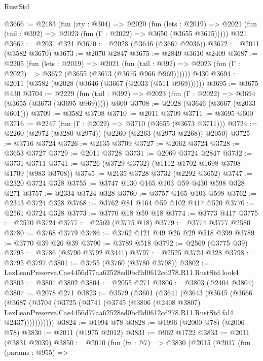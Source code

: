 \begin{lexlean}{RustStd}
\begin{coremodule}
@3666 := @2183
    (fun (rty : @304) =>
    @2020
      (fun (lets : @2019) =>
      @2021 (fun (tail : @392) => @2023 (fun (Γ : @2022) => @3650 (@3655 @3615)))))
    @321
@3667 := @2031 @321
@3670 := @2028 (@3646 (@3667 @2036))
@3672 := @2011 (@3582 @3670)
@3673 := @2070 @2847
@3675 := @2849 @3610 @2409
@3687 := @2205
    (fun (lets : @2019) =>
    @2021 (fun (tail : @392) => @2023 (fun (Γ : @2022) => @3672 (@3655 (@3673 (@3675 @966 @969))))))
    @430
@3694 := @2011 (@3582 (@2028 (@3646 (@3667 (@2033 (@511 @969))))))
@3695 := @3675 @430
@3704 := @2229
    (fun (tail : @392) => @2023 (fun (Γ : @2022) => @3694 (@3655 (@3673 (@3695 @969)))))
    @600
@3708 := @2028 (@3646 (@3667 (@2033 @601)))
@3709 := @3582 @3708
@3710 := @2011 @3709
@3711 := @3695 @600
@3716 := @2247 (fun (Γ : @2022) => @3710 (@3655 (@3673 @3711)))
@3724 := @2260 (@2972 (@3280 @2974)) (@2260 (@2263 (@2973 @2268)) @2050)
@3725 := @3716 @3724
@3726 := @2135 @3709
@3727 := @2062 @3724
@3728 := @3653 @3727
@3729 := @2011 @3728
@3731 := @2069 @3724 @2847
@3732 := @3731 @3711
@3741 := @3726 (@3729 @3732) (@1112 @1702 @1698 @3708 @1709 (@983 @3708))
@3745 := @2135 @3728 @3732 (@2292 @3652)
@3747 := @2320 @3724 @328
@3755 := @3747 @130 @165 @103 @59 @430 @598 @328 @271
@3757 := @2334 @3724 @328
@3760 := @3757 @165 @103 @598
@3762 := @2343 @3724 @328
@3768 := @3762 @81 @164 @59 @102 @417 @520
@3770 := @2561 @3724 @328
@3773 := @3770 @18 @59 @18
@3774 := @3773 @417
@3775 := @2570 @3724
@3777 := @2569 (@3775 @18)
@3779 := @3774 @3777 @2580
@3780 := @3768 @3779
@3786 := @3762 @121 @49 @26 @29 @518 @399
@3789 := @3770 @39 @26 @39
@3790 := @3789 @518
@3792 := @2569 (@3775 @39)
@3795 := @3786 (@3790 @3792 @3441)
@3797 := @2525 @3724 @328
@3798 := @3795 @3797
@3801 := @3755 (@3760 (@3780 @3798))
@3802 := LexLeanPreserve.Cae4456d77aa62528ed0bd9d0612cd278.R11.RustStd.look4
@3803 := @3801 @3802
@3804 := @2055 @271
@3806 := @3803 (@2404 @3804)
@3807 := @2078 @271
@3823 := @3579
    (@3601
      (@3641
        (@3643
          (@3645
            (@3666
              (@3687
                (@3704
                  (@3725
                    (@3741
                      (@3745
                        (@3806
                          (@2408 @3807)
                          LexLeanPreserve.Cae4456d77aa62528ed0bd9d0612cd278.R11.RustStd.fal4
                          @2437)))))))))))
@3824 := @1994 @78
@3828 := @1996 (@2000 @78) (@2006 @78)
@3830 := @2011 (@1975 @2012)
@3831 := @962 @1722
@3833 := @2011 (@3831 @2039)
@3850 := @2010
    (fun (fn : @7) =>
    @3830
      (@2015
        (@2017
          (fun (params : @955) =>

\end{coremodule}
\end{lexlean}
